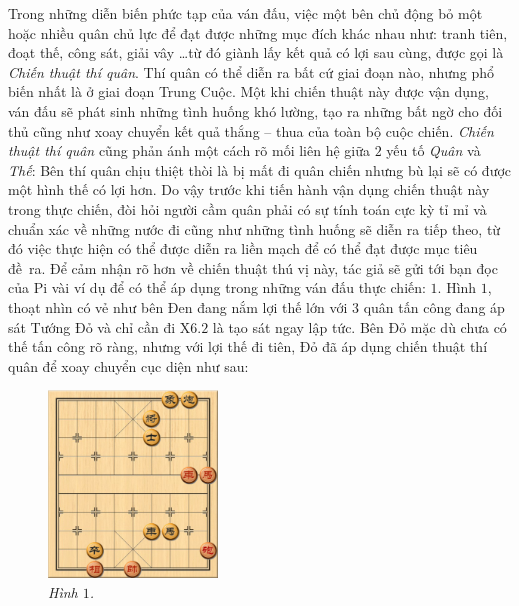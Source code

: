 \vspace*{155pt}
\begin{multicols}{2}	
	Trong những diễn biến phức tạp của ván đấu, việc một bên chủ động bỏ một hoặc nhiều quân chủ lực để đạt được những mục đích khác nhau như: tranh tiên, đoạt thế, công sát, giải vây \ldots từ đó giành lấy kết quả có lợi sau cùng, được gọi là \textit{Chiến thuật thí quân}. Thí quân có thể diễn ra bất cứ giai đoạn nào, nhưng phổ biến nhất là ở giai đoạn Trung Cuộc. Một khi chiến thuật này được vận dụng, ván đấu sẽ phát sinh những tình huống khó lường, tạo ra những bất ngờ cho đối thủ cũng như xoay chuyển kết quả thắng -- thua của toàn bộ cuộc chiến.
	\vskip 0.1cm
	\textit{Chiến thuật thí quân} cũng phản ánh một cách rõ mối liên hệ giữa $2$ yếu tố \textit{Quân} và \textit{Thế}: Bên thí quân chịu thiệt thòi là bị mất đi quân chiến nhưng bù lại sẽ có được một hình thế có lợi hơn. Do vậy trước khi tiến hành vận dụng chiến thuật này trong thực chiến, đòi hỏi người cầm quân phải có sự tính toán cực kỳ tỉ mỉ và chuẩn xác về những nước đi cũng như những tình huống sẽ diễn ra tiếp theo, từ đó việc thực hiện có thể được diễn ra liền mạch để có thể đạt được mục tiêu đề~ra.
	\vskip 0.1cm
	Để cảm nhận rõ hơn về chiến thuật thú vị này, tác giả sẽ gửi tới bạn đọc của Pi vài ví dụ  để có thể  áp dụng trong những ván đấu thực chiến:
	\vskip 0.1cm
	$1.$ Hình $1$, thoạt nhìn có vẻ như bên Đen đang nắm lợi thế lớn với $3$ quân tấn công đang áp sát Tướng Đỏ và chỉ cần đi X$6.2$ là tạo sát ngay lập tức. Bên Đỏ mặc dù chưa có thế tấn công rõ ràng, nhưng với lợi thế đi tiên, Đỏ đã áp dụng chiến thuật thí quân để xoay chuyển cục diện như sau:
	\begin{figure}[H]
		\vspace*{-5pt}
		\centering
		\captionsetup{labelformat= empty, justification=centering}
		\includegraphics[width= 0.4\textwidth]{1}
		\caption{\small\textit{\color{gocco}Hình $1$.}}
		\vspace*{-10pt}
	\end{figure}

\end{multicols}
